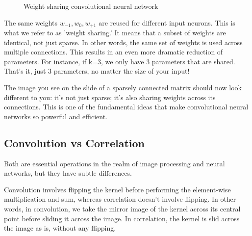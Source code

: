 \documentclass[11pt]{article}
\begin{document}
\begin{figure}[H]
    \centering
    \caption{Weight sharing convolutional neural network}
\end{figure}

The same weights $w_{-1},w_0,w_{+1}$ are reused for different input neurons. This is what we refer to as 'weight sharing.' It means that a subset of weights are identical, not just sparse. In other words, the same set of weights is used across multiple connections. This results in an even more dramatic reduction of parameters. For instance, if k=3, we only have 3 parameters that are shared. That's it, just 3 parameters, no matter the size of your input!

The image you see on the slide of a sparsely connected matrix should now look different to you: it's not just sparse; it's also sharing weights across its connections. This is one of the fundamental ideas that make convolutional neural networks so powerful and efficient.

\subsection{Convolution vs Correlation}

Both are essential operations in the realm of image processing and neural networks, but they have subtle differences.

Convolution involves flipping the kernel before performing the element-wise multiplication and sum, whereas correlation doesn't involve flipping. In other words, in convolution, we take the mirror image of the kernel across its central point before sliding it across the image. In correlation, the kernel is slid across the image as is, without any flipping.
\end{document}
